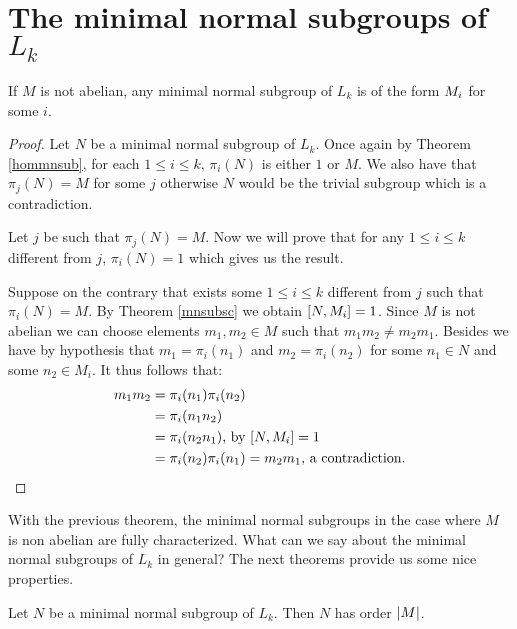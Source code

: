 \section{The minimal normal subgroups of \texorpdfstring{$L_k$}{Lk}}

\begin{theorem}
    \label{nabmnsub}
    If $M$ is not abelian, any minimal normal subgroup of $L_k$ is of the form $M_{i}$ for some $i$.
\end{theorem}

\begin{proof}
    Let $N$ be a minimal normal subgroup of $L_k$.
    Once again by Theorem \ref{hommnsub}, for each $1 \le i \le k$, $\pi_i(N)$ is either $1$ or $M$. We also have that $\pi_j(N) = M$ for some $j$ otherwise $N$ would be the trivial subgroup which is a contradiction.

    Let $j$ be such that $\pi_j(N) = M$. Now we will prove that for any $1 \le i \le k$ different from $j$, $\pi_i(N) = 1$ which gives us the result.
    
    Suppose on the contrary that exists some $1 \le i \le k$ different from $j$ such that $\pi_i(N) = M$.
    By Theorem \ref{mnsubsc} we obtain $[N, M_{i}] = 1$. Since $M$ is not abelian we can choose elements $m_1, m_2 \in M$ such that $m_1m_2 \ne m_2m_1$. Besides we have by hypothesis that $m_1 = \pi_i(n_1)$ and $m_2 = \pi_i(n_2)$ for some $n_1 \in N$ and some  $n_2 \in M_i$. It thus follows that:
    \begin{align*}
       m_1m_2 &= \pi_i(n_1)\pi_i(n_2) \\
              &= \pi_i(n_1n_2) \\
              &= \pi_i(n_2n_1) \text{, by } [N, M_{i}] = 1 \\
              &= \pi_i(n_2)\pi_i(n_1) = m_2m_1 \text{, a contradiction.}
    \end{align*}

\end{proof}

With the previous theorem, the minimal normal subgroups in the case where $M$ is non abelian are fully characterized.
What can we say about the minimal normal subgroups of $L_k$ in general? The next theorems provide us some nice properties.

\begin{theorem}
    \label{abmnsub}
    Let $N$ be a minimal normal subgroup of $L_k$. Then $N$ has order $| M |$. 
    
\end{theorem}


